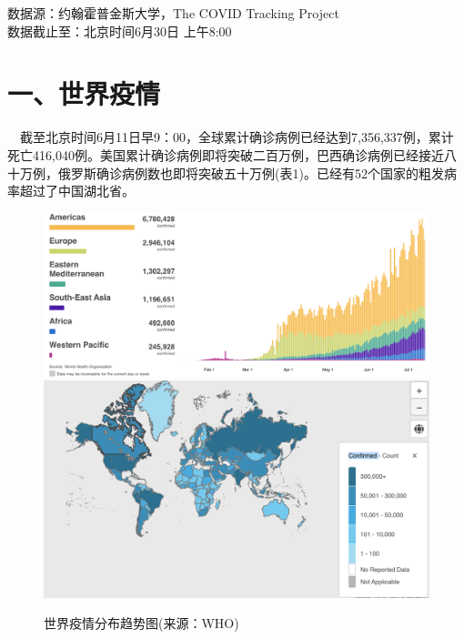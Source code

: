 \documentclass[
]{article}
\begin{document}
\vspace{5mm}

%
  \noindent{}%

\begin{Large}
{数据源：约翰霍普金斯大学，The COVID Tracking Project \\ 数据截止至：北京时间6月30日 上午8:00}
\end{Large}

\vspace{-7mm}

\hypertarget{section-2}{%
\section{\texorpdfstring{\textcolor{glaucous}{\Huge 一、世界疫情}}{}}\label{section-2}}

\vspace{-5mm}

\(\quad\)截至北京时间6月11日早9：00，全球累计确诊病例已经达到7,356,337例，累计死亡416,040例。美国累计确诊病例即将突破二百万例，巴西确诊病例已经接近八十万例，俄罗斯确诊病例数也即将突破五十万例(表1)。已经有52个国家的粗发病率超过了中国湖北省。

\begin{figure}[H]
\caption{世界疫情分布趋势图(来源：WHO)} %
\centering
\includegraphics[]{./input/covid1.png} %
\includegraphics[]{./input/covid4.png}
\label{} %
\end{figure}
\end{document}
